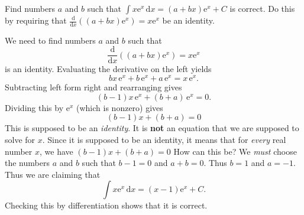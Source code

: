 \documentclass[12pt,fleqn,answers]{exam}
\newcommand{\reals}{\mathbf{R}}
\begin{document}
\begin{questions}


\question [1] Find numbers $a$ and $b$ such that
$
 \int x  \mathrm{e}^x \, \mathrm{d} x = (a + b x) \mathrm{e}^x + C
$
is correct. Do this by requiring that
$
\frac{\mathrm{d}}{\mathrm{d} x} \left((a + b x) \mathrm{e}^x \right)
   = x  \mathrm{e}^x
$ be an identity.
\begin{solution}
We need to find numbers $a$ and $b$ such that 
\begin{equation*}
  \frac{\mathrm{d}}{\mathrm{d} x}
  \left((a + b x) \mathrm{e}^x \right) = x  \mathrm{e}^x
\end{equation*}
is an identity. Evaluating the derivative on the left yields
\begin{equation*}
  b x\, {{\mathrm e}^{x}}+b\, {{\mathrm e}^{x}}+a\, {{\mathrm e}^{x}}=x\, {{\mathrm e}^{x}}.
\end{equation*}
Subtracting left form right and rearranging gives
\begin{equation*}
  \left( b-1\right)  x\, {{\mathrm e}^{x}}+\left( b+a\right) \, {{\mathrm e}^{x}}=0.
\end{equation*}
Dividing this by ${\mathrm e}^{x}$ (which is nonzero) gives
\begin{equation*}
  \left( b-1\right)  x +\left( b+a\right) =0
\end{equation*}
This is supposed to be an \emph{identity}. It is \textbf{not}
an equation that we are supposed to solve for $x$. Since 
it is supposed to be an identity, it means that for
\emph{every} real number $x$, we have $\left( b-1\right)  x +\left( b+a\right) =0$
How can this be? We \emph{must} choose the numbers $a$ and
$b$ such that $b-1= 0$ and $a+b=0$. Thus $b=1$ and $a=-1$.
Thus we are claiming that
$$
 \int x  \mathrm{e}^x \, \mathrm{d} x = (x - 1) \mathrm{e}^x + C.
$$
Checking this by differentiation shows that it is correct.

\end{solution}

\end{questions}
\end{document}
